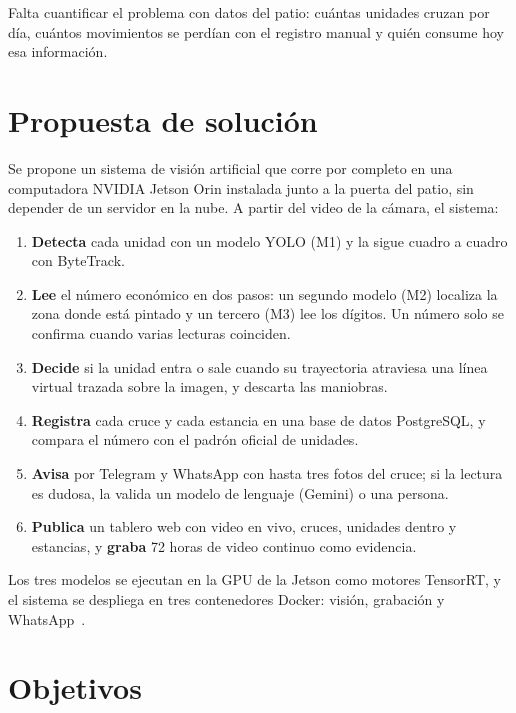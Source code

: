 \begin{aviso}[title={Por validar}]
Falta cuantificar el problema con datos del patio: cuántas unidades cruzan
por día, cuántos movimientos se perdían con el registro manual y quién
consume hoy esa información.
\end{aviso}

\section{Propuesta de solución}
\label{sec:propuesta}

Se propone un sistema de visión artificial que corre por completo en una
computadora NVIDIA Jetson Orin instalada junto a la puerta del patio, sin
depender de un servidor en la nube. A partir del video de la cámara, el
sistema:

\begin{enumerate}
  \item \textbf{Detecta} cada unidad con un modelo YOLO (M1) y la sigue
        cuadro a cuadro con ByteTrack.
  \item \textbf{Lee} el número económico en dos pasos: un segundo modelo
        (M2) localiza la zona donde está pintado y un tercero (M3) lee los
        dígitos. Un número solo se confirma cuando varias lecturas
        coinciden.
  \item \textbf{Decide} si la unidad entra o sale cuando su trayectoria
        atraviesa una línea virtual trazada sobre la imagen, y descarta las
        maniobras.
  \item \textbf{Registra} cada cruce y cada estancia en una base de datos
        PostgreSQL, y compara el número con el padrón oficial de unidades.
  \item \textbf{Avisa} por Telegram y WhatsApp con hasta tres fotos del
        cruce; si la lectura es dudosa, la valida un modelo de lenguaje
        (Gemini) o una persona.
  \item \textbf{Publica} un tablero web con video en vivo, cruces, unidades
        dentro y estancias, y \textbf{graba} 72 horas de video continuo como
        evidencia.
\end{enumerate}

Los tres modelos se ejecutan en la GPU de la Jetson como motores TensorRT,
y el sistema se despliega en tres contenedores Docker: visión, grabación y
WhatsApp~\cite{rep-tecnico}.

\section{Objetivos}

